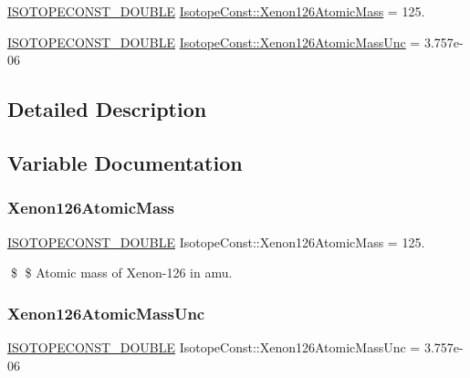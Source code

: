 \begin{DoxyCompactItemize}
\item 
\mbox{\hyperlink{group___isotope_const-_macros_ga8f45a7272ce02c0b4c65c44636ed719a}{I\+S\+O\+T\+O\+P\+E\+C\+O\+N\+S\+T\+\_\+\+D\+O\+U\+B\+LE}} \mbox{\hyperlink{group___isotope_const-_xenon-_xe126_ga23a076e79e8781963130ffd16a6fd3c2}{Isotope\+Const\+::\+Xenon126\+Atomic\+Mass}} = 125.
\item 
\mbox{\hyperlink{group___isotope_const-_macros_ga8f45a7272ce02c0b4c65c44636ed719a}{I\+S\+O\+T\+O\+P\+E\+C\+O\+N\+S\+T\+\_\+\+D\+O\+U\+B\+LE}} \mbox{\hyperlink{group___isotope_const-_xenon-_xe126_ga8ea11b29cc798b35927b9879e01aa288}{Isotope\+Const\+::\+Xenon126\+Atomic\+Mass\+Unc}} = 3.\+757e-\/06
\end{DoxyCompactItemize}


\subsection{Detailed Description}


\subsection{Variable Documentation}
\mbox{\label{group___isotope_const-_xenon-_xe126_ga23a076e79e8781963130ffd16a6fd3c2}} 
\subsubsection{\texorpdfstring{Xenon126\+Atomic\+Mass}{Xenon126AtomicMass}}
{\footnotesize\ttfamily \mbox{\hyperlink{group___isotope_const-_macros_ga8f45a7272ce02c0b4c65c44636ed719a}{I\+S\+O\+T\+O\+P\+E\+C\+O\+N\+S\+T\+\_\+\+D\+O\+U\+B\+LE}} Isotope\+Const\+::\+Xenon126\+Atomic\+Mass = 125.}

\$ \$ Atomic mass of Xenon-\/126 in amu. \mbox{\label{group___isotope_const-_xenon-_xe126_ga8ea11b29cc798b35927b9879e01aa288}} 
\subsubsection{\texorpdfstring{Xenon126\+Atomic\+Mass\+Unc}{Xenon126AtomicMassUnc}}
{\footnotesize\ttfamily \mbox{\hyperlink{group___isotope_const-_macros_ga8f45a7272ce02c0b4c65c44636ed719a}{I\+S\+O\+T\+O\+P\+E\+C\+O\+N\+S\+T\+\_\+\+D\+O\+U\+B\+LE}} Isotope\+Const\+::\+Xenon126\+Atomic\+Mass\+Unc = 3.\+757e-\/06}

